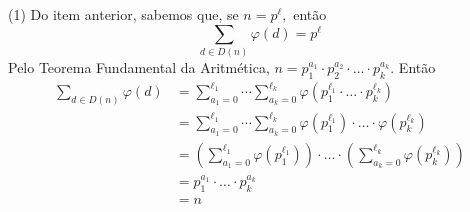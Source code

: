 \documentclass[12pt, a4paper]{article}
\newcommand{\negrito}[1]{\mbox{\boldmath{$#1$}}}
\newcommand{\itens}[1]{\begin{tasks}[label={(tsk[a])},label-width=3.6ex, label-format = {\bfseries}, column-sep = {0pt}](1) #1\end{tasks}}
\newcommand{\alt}[1]{\textcolor{Floresta}{$\negrito{(#1)} $}}
\begin{document}
\begin{solution}
\itens{
\task[\alt{a}]
\task[\alt{b}]
\task[\alt{c}]
\task[\alt{d}] Do item anterior, sabemos que, se $n = p^{\ell},$ então
\[
\sum\limits_{d \in D(n)} \varphi(d) = p^{\ell}
\]
Pelo Teorema Fundamental da Aritmética, $n = p_1^{a_1} \cdot p_2^{a_2} \cdot \ldots \cdot p_k^{a_k}.$ Então
\begin{align*}
\sum\limits_{d \in D(n)} \varphi(d) &= \sum\limits_{a_1 = 0}^{\ell_1} \cdots \sum\limits_{a_k = 0}^{\ell_k} \varphi(p_1^{\ell_1} \cdot \ldots \cdot p_k^{\ell_k})\\ &= \sum\limits_{a_1 = 0}^{\ell_1} \cdots \sum\limits_{a_k = 0}^{\ell_k} \varphi(p_1^{\ell_1}) \cdot \ldots \cdot \varphi(p_k^{\ell_k}) \\
&= \left( \sum\limits_{a_1 = 0}^{\ell_1} \varphi(p_1^{\ell_1}) \right) \cdot \ldots \cdot \left( \sum\limits_{a_k = 0}^{\ell_k} \varphi(p_k^{\ell_k})  \right)\\
&= p_1^{a_1} \cdot \ldots \cdot p_k^{a_k}  \\
&= n
\end{align*}
}
\end{solution}
\end{document}
